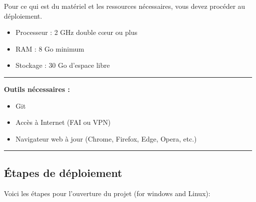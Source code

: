 \documentclass[12pt]{article}
\begin{document}
Pour ce qui est du matériel et les ressources nécessaires, vous devez procéder au déploiement.

\begin{itemize}[label=--]
    \item Processeur : 2 GHz double cœur ou plus
    \item RAM : 8 Go minimum
    \item Stockage : 30 Go d’espace libre
\end{itemize}
\rule{\linewidth}{0.2pt}
\textbf{Outils nécessaires :}

\begin{itemize}[label=--]
    \item Git
    \item Accès à Internet (FAI ou VPN)
    \item Navigateur web à jour (Chrome, Firefox, Edge, Opera, etc.)
\end{itemize}
\rule{\linewidth}{0.2pt}
\subsection{Étapes de déploiement}

Voici les étapes pour l’ouverture du projet (for windows and Linux):
\end{document}
